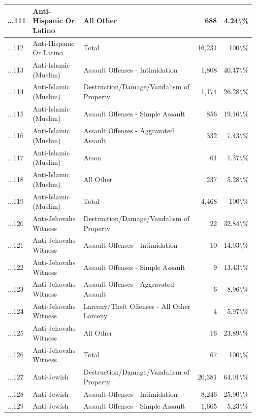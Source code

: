\documentclass[
]{krantz}
\begin{document}
\begin{longtable}[t]{l|l|l|r|r}
\hline
...111 & Anti-Hispanic Or Latino & All Other & 688 & 4.24\textbackslash{}\%\\
\hline
...112 & Anti-Hispanic Or Latino & Total & 16,231 & 100\textbackslash{}\%\\
\hline
...113 & Anti-Islamic (Muslim) & Assault Offenses - Intimidation & 1,808 & 40.47\textbackslash{}\%\\
\hline
...114 & Anti-Islamic (Muslim) & Destruction/Damage/Vandalism of Property & 1,174 & 26.28\textbackslash{}\%\\
\hline
...115 & Anti-Islamic (Muslim) & Assault Offenses - Simple Assault & 856 & 19.16\textbackslash{}\%\\
\hline
...116 & Anti-Islamic (Muslim) & Assault Offenses - Aggravated Assault & 332 & 7.43\textbackslash{}\%\\
\hline
...117 & Anti-Islamic (Muslim) & Arson & 61 & 1.37\textbackslash{}\%\\
\hline
...118 & Anti-Islamic (Muslim) & All Other & 237 & 5.28\textbackslash{}\%\\
\hline
...119 & Anti-Islamic (Muslim) & Total & 4,468 & 100\textbackslash{}\%\\
\hline
...120 & Anti-Jehovahs Witness & Destruction/Damage/Vandalism of Property & 22 & 32.84\textbackslash{}\%\\
\hline
...121 & Anti-Jehovahs Witness & Assault Offenses - Intimidation & 10 & 14.93\textbackslash{}\%\\
\hline
...122 & Anti-Jehovahs Witness & Assault Offenses - Simple Assault & 9 & 13.43\textbackslash{}\%\\
\hline
...123 & Anti-Jehovahs Witness & Assault Offenses - Aggravated Assault & 6 & 8.96\textbackslash{}\%\\
\hline
...124 & Anti-Jehovahs Witness & Larceny/Theft Offenses - All Other Larceny & 4 & 5.97\textbackslash{}\%\\
\hline
...125 & Anti-Jehovahs Witness & All Other & 16 & 23.89\textbackslash{}\%\\
\hline
...126 & Anti-Jehovahs Witness & Total & 67 & 100\textbackslash{}\%\\
\hline
...127 & Anti-Jewish & Destruction/Damage/Vandalism of Property & 20,381 & 64.01\textbackslash{}\%\\
\hline
...128 & Anti-Jewish & Assault Offenses - Intimidation & 8,246 & 25.90\textbackslash{}\%\\
\hline
...129 & Anti-Jewish & Assault Offenses - Simple Assault & 1,665 & 5.23\textbackslash{}\%\\

\end{longtable}
\end{document}
